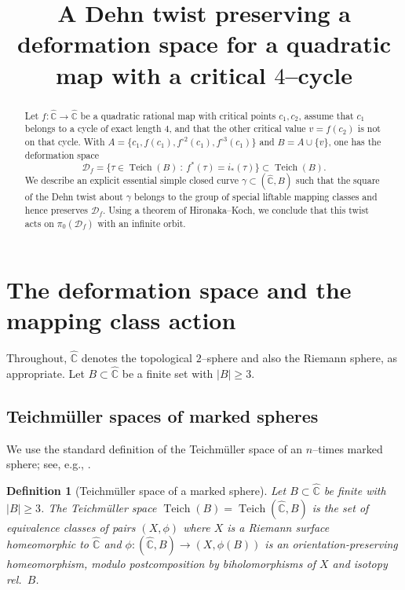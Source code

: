 \documentclass[11pt]{article}
\newtheorem{definition}[theorem]{Definition}
\DeclareMathOperator{\Teich}{Teich}
\begin{document}
\title{A Dehn twist preserving a deformation space for a quadratic map with a critical $4$--cycle}
\author{}
\date{}
\maketitle

\begin{abstract}
Let $f:\widehat{\mathbb C}\to \widehat{\mathbb C}$ be a quadratic rational map with critical points $c_1,c_2$, assume that $c_1$ belongs to a cycle of exact length $4$, and that the other critical value $v=f(c_2)$ is not on that cycle. With $A=\{c_1,f(c_1),f^{\circ 2}(c_1),f^{\circ 3}(c_1)\}$ and $B=A\cup\{v\}$, one has the deformation space
\[
\mathcal D_f=\{\tau\in \Teich(B)\ :\ f^*(\tau)=i_*(\tau)\}\subset \Teich(B).
\]
We describe an explicit essential simple closed curve $\gamma\subset(\widehat{\mathbb C},B)$ such that the square of the Dehn twist about $\gamma$ belongs to the group of special liftable mapping classes and hence preserves $\mathcal D_f$. Using a theorem of Hironaka--Koch, we conclude that this twist acts on $\pi_0(\mathcal D_f)$ with an infinite orbit.
\end{abstract}

\section{The deformation space and the mapping class action}

Throughout, $\widehat{\mathbb C}$ denotes the topological $2$--sphere and also the Riemann sphere, as appropriate. Let $B\subset \widehat{\mathbb C}$ be a finite set with $|B|\ge 3$.

\subsection{Teichm\"uller spaces of marked spheres}
We use the standard definition of the Teichm\"uller space of an $n$--times marked sphere; see, e.g., \cite[\S2]{FM12}.

\begin{definition}[Teichm\"uller space of a marked sphere]
Let $B\subset \widehat{\mathbb C}$ be finite with $|B|\ge 3$. The Teichm\"uller space $\Teich(B)=\Teich(\widehat{\mathbb C},B)$ is the set of equivalence classes of pairs $(X,\phi)$ where $X$ is a Riemann surface homeomorphic to $\widehat{\mathbb C}$ and $\phi:(\widehat{\mathbb C},B)\to (X,\phi(B))$ is an orientation-preserving homeomorphism, modulo postcomposition by biholomorphisms of $X$ and isotopy rel.\ $B$.
\end{definition}
\end{document}

